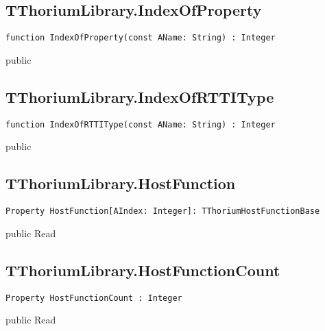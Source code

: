 \subsection{TThoriumLibrary.IndexOfProperty}
\label{thoriumcore:thorium:tthoriumlibrary:indexofproperty}
\begin{FPCList}
\Synopsis
\Declaration 

\begin{verbatim}
function IndexOfProperty(const AName: String) : Integer
\end{verbatim}
\Visibility
public
\Description
\Errors
\end{FPCList}
\subsection{TThoriumLibrary.IndexOfRTTIType}
\label{thoriumcore:thorium:tthoriumlibrary:indexofrttitype}
\begin{FPCList}
\Synopsis
\Declaration 

\begin{verbatim}
function IndexOfRTTIType(const AName: String) : Integer
\end{verbatim}
\Visibility
public
\Description
\Errors
\end{FPCList}
\subsection{TThoriumLibrary.HostFunction}
\label{thoriumcore:thorium:tthoriumlibrary:hostfunction}
\begin{FPCList}
\Synopsis
\Declaration 

\begin{verbatim}
Property HostFunction[AIndex: Integer]: TThoriumHostFunctionBase
\end{verbatim}
\Visibility
public
\Access
Read
\Description
\end{FPCList}
\subsection{TThoriumLibrary.HostFunctionCount}
\label{thoriumcore:thorium:tthoriumlibrary:hostfunctioncount}
\begin{FPCList}
\Synopsis
\Declaration 

\begin{verbatim}
Property HostFunctionCount : Integer
\end{verbatim}
\Visibility
public
\Access
Read
\Description
\end{FPCList}
